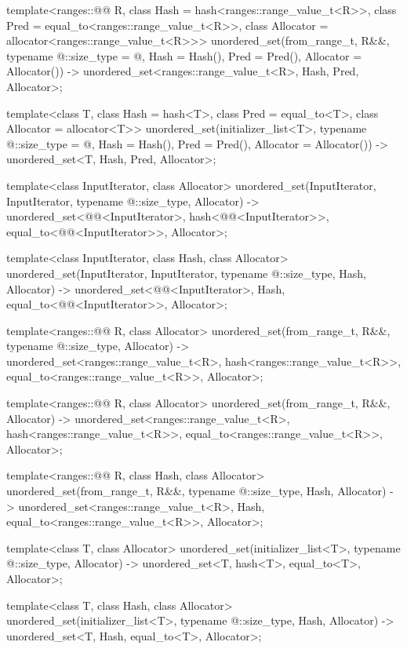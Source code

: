 \begin{codeblock}
{  template<ranges::@@ R,
           class Hash = hash<ranges::range_value_t<R>>,
           class Pred = equal_to<ranges::range_value_t<R>>,
           class Allocator = allocator<ranges::range_value_t<R>>>
    unordered_set(from_range_t, R&&, typename @\seebelow@::size_type = @\seebelow@,
Hash = Hash(), Pred = Pred(), Allocator = Allocator())
      -> unordered_set<ranges::range_value_t<R>, Hash, Pred, Allocator>;

  template<class T, class Hash = hash<T>,
           class Pred = equal_to<T>, class Allocator = allocator<T>>
    unordered_set(initializer_list<T>, typename @\seebelow@::size_type = @\seebelow@,
                  Hash = Hash(), Pred = Pred(), Allocator = Allocator())
      -> unordered_set<T, Hash, Pred, Allocator>;

  template<class InputIterator, class Allocator>
    unordered_set(InputIterator, InputIterator, typename @\seebelow@::size_type, Allocator)
      -> unordered_set<@@<InputIterator>,
                       hash<@@<InputIterator>>,
                       equal_to<@@<InputIterator>>,
                       Allocator>;

  template<class InputIterator, class Hash, class Allocator>
    unordered_set(InputIterator, InputIterator, typename @\seebelow@::size_type,
                  Hash, Allocator)
      -> unordered_set<@@<InputIterator>, Hash,
                       equal_to<@@<InputIterator>>,
                       Allocator>;

  template<ranges::@@ R, class Allocator>
    unordered_set(from_range_t, R&&, typename @\seebelow@::size_type, Allocator)
      -> unordered_set<ranges::range_value_t<R>, hash<ranges::range_value_t<R>>,
                       equal_to<ranges::range_value_t<R>>, Allocator>;

  template<ranges::@@ R, class Allocator>
    unordered_set(from_range_t, R&&, Allocator)
      -> unordered_set<ranges::range_value_t<R>, hash<ranges::range_value_t<R>>,
                       equal_to<ranges::range_value_t<R>>, Allocator>;

  template<ranges::@@ R, class Hash, class Allocator>
    unordered_set(from_range_t, R&&, typename @\seebelow@::size_type, Hash, Allocator)
      -> unordered_set<ranges::range_value_t<R>, Hash,
                       equal_to<ranges::range_value_t<R>>, Allocator>;

  template<class T, class Allocator>
    unordered_set(initializer_list<T>, typename @\seebelow@::size_type, Allocator)
      -> unordered_set<T, hash<T>, equal_to<T>, Allocator>;

  template<class T, class Hash, class Allocator>
    unordered_set(initializer_list<T>, typename @\seebelow@::size_type, Hash, Allocator)
      -> unordered_set<T, Hash, equal_to<T>, Allocator>;
}
\end{codeblock}

